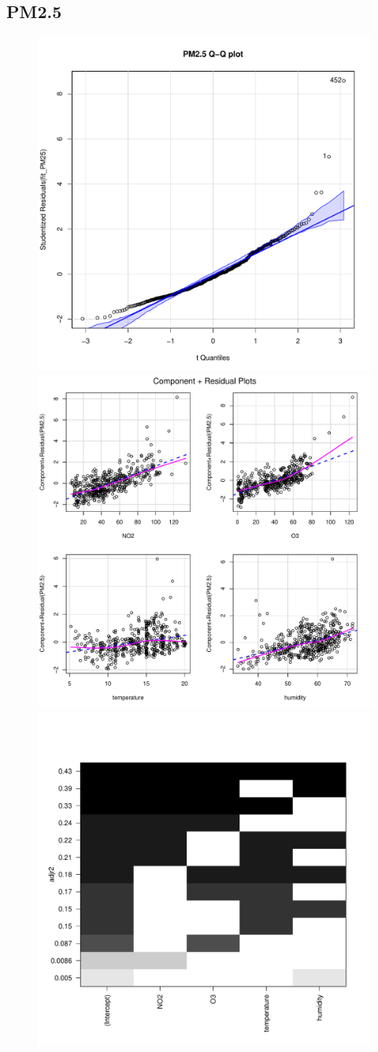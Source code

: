 \documentclass[a4paper,12pt,reqno]{report}
\begin{document}
\subsection{PM2.5}
\begin{figure}[H]
    \centering
    \vspace{-0.35cm}
    \includegraphics[width=0.4\linewidth]{figures/mul_reg_qqPlot_PM25.pdf}
    \includegraphics[width=0.4\linewidth]{figures/mul_reg_crPlots_PM25.pdf}
    \includegraphics[width=0.4\linewidth]{figures/mul_reg_adjr2_PM25.pdf}
\end{figure}
\end{document}
